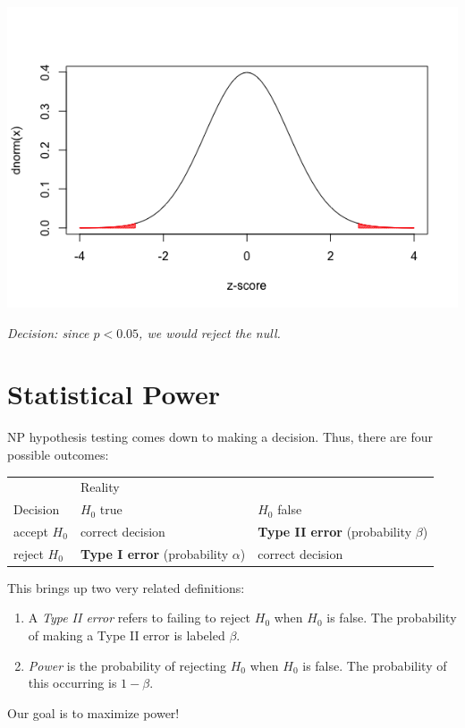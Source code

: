 \documentclass[11pt]{article}
\begin{document}
\includegraphics[width=.9\linewidth]{figures/week4/twoTailed.png}

\emph{Decision: since $p<0.05$, we would reject the null.}
\section*{Statistical Power}
\label{sec-3}

NP hypothesis testing comes down to making a decision.  Thus, there are four possible outcomes:

\begin{center}
\begin{tabular}{lll}
 & Reality & \\
Decision & $H_0$ true & $H_0$ false\\
accept $H_0$ & correct decision & \textbf{Type II error} (probability $\beta$)\\
reject $H_0$ & \textbf{Type I error} (probability $\alpha$) & correct decision\\
\end{tabular}
\end{center}

This brings up two very related definitions:

\begin{enumerate}
\item A \emph{Type II error} refers to failing to reject $H_0$ when $H_0$ is false.  The probability of making a Type II error is labeled $\beta$.

\item \emph{Power} is the probability of rejecting $H_0$ when $H_0$ is false.  The probability of this occurring is $1-\beta$.
\end{enumerate}

Our goal is to maximize power!
\end{document}
